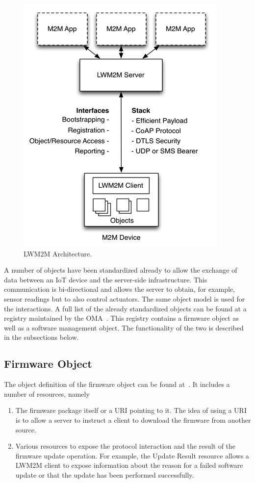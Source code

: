 \documentclass[peerreview, a4paper, 7pt]{IEEEtran}
\begin{document}
\begin{figure}[!htbp]
 \centering
 \includegraphics[scale=0.50]{lwm2m-architecture.jpg}
 \caption{LWM2M Architecture.}
 \label{lwm2m-architecture-figure}
\end{figure}

A number of objects have been standardized already to allow the exchange of data between an IoT device and the server-side infrastructure. This communication is bi-directional and allows the server to obtain, for example, sensor readings but to also control actuators. The same object model is used for the interactions. A full list of the already standardized objects can be found at a registry maintained by the OMA~\cite{OMNA}. This registry contains a firmware object as well as a software management object. The functionality of the two is described in the subsections below.

\subsection{Firmware Object} 
The object definition of the firmware object can be found at~\cite{firmware-object}. It includes a number of resources, namely 
\begin{enumerate}
\item The firmware package itself or a URI pointing to it. The idea of using a URI is to allow a server to instruct a client to download the firmware from another source. 
\item Various resources to expose the protocol interaction and the result of the firmware update operation. For example, the Update Result resource allows a LWM2M client to expose information about the reason for a failed software update or that the update has been performed successfully. 
\end{enumerate}
\end{document}
